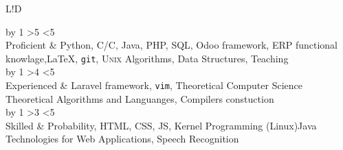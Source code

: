 \documentclass[11pt]{article}
\def\CC{{C\nolinebreak[4]\hspace{-.05em}\raisebox{.4ex}{\tiny\bf ++}}}
\newcommand{\VRule}{\color{lightgray}\vrule width 0.5pt}
\newcommand{\stars}[3]{%
{\starid=0
\loop
	\advance\starid by 1
	\ifnum\starid>#1 \textcolor{lightgray}{\!\textbullet}
	\else \textcolor{maincolour}{\!\textbullet}
	\fi
	\ifnum\starid<#2
\repeat} \\ #3
}
\newcommand{\cvtable}[1]{%
\begin{tabular}{L!{\VRule}D}#1\end{tabular}}
\begin{document}
\cvtable{%

\stars{5}{5}{Proficient} & Python, C/\CC, Java, PHP, SQL, Odoo framework, ERP functional knowlage,\newline \LaTeX, \texttt{git}, \textsc{Unix} Algorithms, Data Structures, Teaching 
\\[5pt]

\stars{4}{5}{Experienced} & Laravel framework, \texttt{vim}, Theoretical Computer Science \newline Theoretical Algorithms and Languanges, Compilers constuction
\\[5pt]

\stars{3}{5}{Skilled} & Probability, HTML, CSS, JS, Kernel Programming (Linux)\newline Java Technologies for Web Applications, Speech Recognition
}

\end{document}
